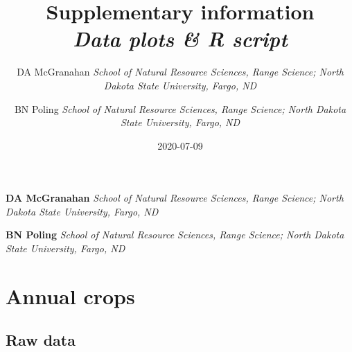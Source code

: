 \documentclass[]{scrartcl}
\title{Supplementary information \newline \\ \Large \emph{Data plots \& R script}   }
\date{2020-07-09}
\author{\Large DA McGranahan  \normalsize \emph{School of Natural Resource Sciences, Range Science; North Dakota State
University, Fargo, ND}   \and \Large BN Poling  \normalsize \emph{School of Natural Resource Sciences, Range Science; North Dakota State
University, Fargo, ND}  }
\newcommand*{\authorfont}{\fontfamily{phv}\selectfont}
\begin{document}
	
%

{%
\setlength{\parindent}{0pt}
\thispagestyle{plain}
{\fontsize{18}{20}\selectfont\raggedright 
\maketitle  %
}


{
   \vskip 13.5pt\relax \normalsize\fontsize{11}{12} 
\textbf{\authorfont DA McGranahan} \newline \hspace{0.1in} \vspace{0.05in}  \emph{\small School of Natural Resource Sciences, Range Science; North Dakota State
University, Fargo, ND}   \par \textbf{\authorfont BN Poling} \newline \hspace{0.1in} \vspace{0.05in}  \emph{\small School of Natural Resource Sciences, Range Science; North Dakota State
University, Fargo, ND}   

}

}


\date{}



\vskip 6.5pt

\noindent  \newpage

\hypertarget{annual-crops}{%
\section{Annual crops}\label{annual-crops}}

\hypertarget{raw-data}{%
\subsection{Raw data}\label{raw-data}}
\end{document}
